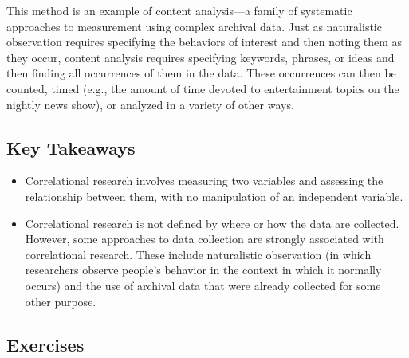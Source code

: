 This method is an example of content analysis---a family of systematic approaches to measurement using complex archival data. Just as naturalistic observation requires specifying the behaviors of interest and then noting them as they occur, content analysis requires specifying keywords, phrases, or ideas and then finding all occurrences of them in the data. These occurrences can then be counted, timed (e.g., the amount of time devoted to entertainment topics on the nightly news show), or analyzed in a variety of other ways.


\subsection{Key Takeaways}

\begin{fullwidth}

\begin{itemize}

\item Correlational research involves measuring two variables and assessing the relationship between them, with no manipulation of an independent variable.

\item Correlational research is not defined by where or how the data are collected. However, some approaches to data collection are strongly associated with correlational research. These include naturalistic observation (in which researchers observe people's behavior in the context in which it normally occurs) and the use of archival data that were already collected for some other purpose.

\end{itemize}

\end{fullwidth}



\subsection{Exercises}

